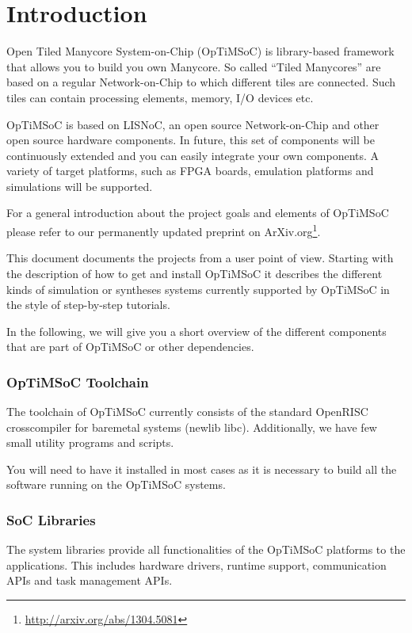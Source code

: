 \chapter{Introduction}
\label{chap:introduction}

Open Tiled Manycore System-on-Chip (OpTiMSoC) is library-based
framework that allows you to build you own Manycore. So called ``Tiled
Manycores'' are based on a regular Network-on-Chip to which different
tiles are connected. Such tiles can contain processing elements,
memory, I/O devices etc.

OpTiMSoC is based on LISNoC, an open source Network-on-Chip and other
open source hardware components. In future, this set of components
will be continuously extended and you can easily integrate your own
components. A variety of target platforms, such as FPGA boards,
emulation platforms and simulations will be supported.

For a general introduction about the project goals and elements of
OpTiMSoC please refer to our permanently updated preprint on
ArXiv.org\footnote{\url{http://arxiv.org/abs/1304.5081}}.

\medskip

This document documents the projects from a user point of view.
Starting with the description of how to get and install OpTiMSoC it
describes the different kinds of simulation or syntheses systems
currently supported by OpTiMSoC in the style of step-by-step
tutorials.

In the following, we will give you a short overview of the different
components that are part of OpTiMSoC or other dependencies.

\subsection*{OpTiMSoC Toolchain}

The toolchain of OpTiMSoC currently consists of the standard OpenRISC
crosscompiler for baremetal systems (newlib libc). Additionally, we
have few small utility programs and scripts.

You will need to have it installed in most cases as it is necessary to
build all the software running on the OpTiMSoC systems.

\subsection*{SoC Libraries}

The system libraries provide all functionalities of the OpTiMSoC
platforms to the applications. This includes hardware drivers, runtime
support, communication APIs and task management APIs.

